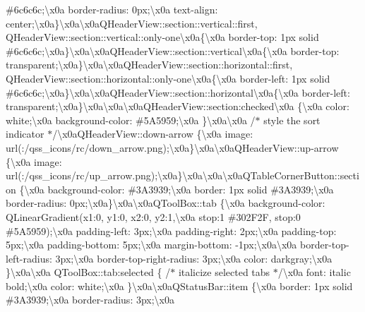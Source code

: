 \#6c6c6c;\textbackslash{}x0a border-\/radius\+: 0px;\textbackslash{}x0a text-\/align\+: center;\textbackslash{}x0a\}\textbackslash{}x0a\textbackslash{}x0a\+Q\+Header\+View\+::section\+::vertical\+::first, Q\+Header\+View\+::section\+::vertical\+::only-\/one\textbackslash{}x0a\{\textbackslash{}x0a border-\/top\+: 1px solid \#6c6c6c;\textbackslash{}x0a\}\textbackslash{}x0a\textbackslash{}x0a\+Q\+Header\+View\+::section\+::vertical\textbackslash{}x0a\{\textbackslash{}x0a border-\/top\+: transparent;\textbackslash{}x0a\}\textbackslash{}x0a\textbackslash{}x0a\+Q\+Header\+View\+::section\+::horizontal\+::first, Q\+Header\+View\+::section\+::horizontal\+::only-\/one\textbackslash{}x0a\{\textbackslash{}x0a border-\/left\+: 1px solid \#6c6c6c;\textbackslash{}x0a\}\textbackslash{}x0a\textbackslash{}x0a\+Q\+Header\+View\+::section\+::horizontal\textbackslash{}x0a\{\textbackslash{}x0a border-\/left\+: transparent;\textbackslash{}x0a\}\textbackslash{}x0a\textbackslash{}x0a\textbackslash{}x0a\+Q\+Header\+View\+::section\+:checked\textbackslash{}x0a \{\textbackslash{}x0a color\+: white;\textbackslash{}x0a background-\/color\+: \#5\+A5959;\textbackslash{}x0a \}\textbackslash{}x0a\textbackslash{}x0a /$\ast$ style the sort indicator $\ast$/\textbackslash{}x0a\+Q\+Header\+View\+::down-\/arrow \{\textbackslash{}x0a image\+: url(\+:/qss\+\_\+icons/rc/down\+\_\+arrow.\+png);\textbackslash{}x0a\}\textbackslash{}x0a\textbackslash{}x0a\+Q\+Header\+View\+::up-\/arrow \{\textbackslash{}x0a image\+: url(\+:/qss\+\_\+icons/rc/up\+\_\+arrow.\+png);\textbackslash{}x0a\}\textbackslash{}x0a\textbackslash{}x0a\textbackslash{}x0a\+Q\+Table\+Corner\+Button\+::section \{\textbackslash{}x0a background-\/color\+: \#3\+A3939;\textbackslash{}x0a border\+: 1px solid \#3\+A3939;\textbackslash{}x0a border-\/radius\+: 0px;\textbackslash{}x0a\}\textbackslash{}x0a\textbackslash{}x0a\+Q\+Tool\+Box\+::tab \{\textbackslash{}x0a background-\/color\+: Q\+Linear\+Gradient(x1\+:0, y1\+:0, x2\+:0, y2\+:1,\textbackslash{}x0a stop\+:1 \#302\+F2\+F, stop\+:0 \#5\+A5959);\textbackslash{}x0a padding-\/left\+: 3px;\textbackslash{}x0a padding-\/right\+: 2px;\textbackslash{}x0a padding-\/top\+: 5px;\textbackslash{}x0a padding-\/bottom\+: 5px;\textbackslash{}x0a margin-\/bottom\+: -\/1px;\textbackslash{}x0a\textbackslash{}x0a border-\/top-\/left-\/radius\+: 3px;\textbackslash{}x0a border-\/top-\/right-\/radius\+: 3px;\textbackslash{}x0a color\+: darkgray;\textbackslash{}x0a \}\textbackslash{}x0a\textbackslash{}x0a Q\+Tool\+Box\+::tab\+:selected \{ /$\ast$ italicize selected tabs $\ast$/\textbackslash{}x0a font\+: italic bold;\textbackslash{}x0a color\+: white;\textbackslash{}x0a \}\textbackslash{}x0a\textbackslash{}x0a\+Q\+Status\+Bar\+::item \{\textbackslash{}x0a border\+: 1px solid \#3\+A3939;\textbackslash{}x0a border-\/radius\+: 3px;\textbackslash{}x0a 